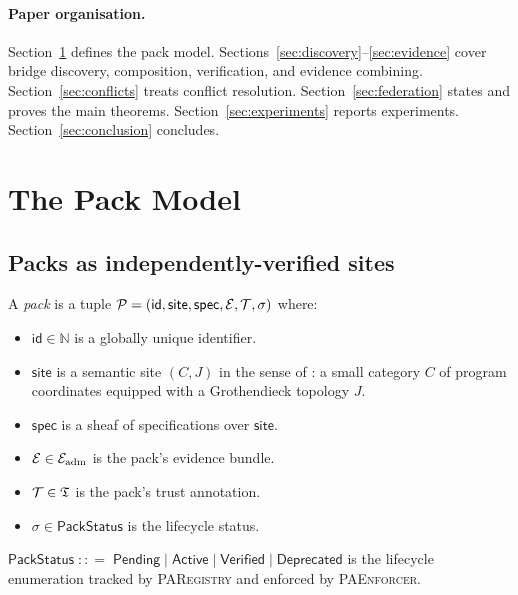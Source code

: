 \documentclass[11pt]{article}
\newcommand{\Pack}{\mathcal{P}}
\newcommand{\PackId}{\mathsf{id}}
\newcommand{\PackSite}{\mathsf{site}}
\newcommand{\PackSpec}{\mathsf{spec}}
\newcommand{\PackSt}{\sigma}
\newcommand{\PackStat}{\mathsf{PackStatus}}
\newcommand{\PAR}{\textsc{PARegistry}}
\newcommand{\PAE}{\textsc{PAEnforcer}}
\begin{document}
\paragraph{Paper organisation.}
Section~\ref{sec:packs} defines the pack model.
Sections~\ref{sec:discovery}--\ref{sec:evidence} cover bridge
discovery, composition, verification, and evidence combining.
Section~\ref{sec:conflicts} treats conflict resolution.
Section~\ref{sec:federation} states and proves the main theorems.
Section~\ref{sec:experiments} reports experiments.
Section~\ref{sec:conclusion} concludes.

\section{The Pack Model}
\label{sec:packs}

\subsection{Packs as independently-verified sites}

\begin{definition}[Pack]
\label{def:pack}
A \emph{pack} is a tuple
$\Pack = (\PackId, \PackSite, \PackSpec, \evid, \trust, \PackSt)$
where:
\begin{itemize}
  \item $\PackId \in \mathbb{N}$ is a globally unique identifier.
  \item $\PackSite$ is a semantic site $(C, J)$ in the sense of
    \cite{jugeo01}: a small category $C$ of program coordinates
    equipped with a Grothendieck topology $J$.
  \item $\PackSpec$ is a sheaf of specifications over $\PackSite$.
  \item $\mathcal{E} \in \mathcal{E}_{\mathrm{adm}}$ is the pack's evidence bundle.
  \item $\mathcal{T} \in \mathfrak{T}$ is the pack's trust annotation.
  \item $\PackSt \in \PackStat$ is the lifecycle status.
\end{itemize}
\end{definition}

\begin{definition}
\label{def:packstatus}
$\PackStat \;{:}{:}{=}\;
  \mathsf{Pending} \mid \mathsf{Active} \mid
  \mathsf{Verified} \mid \mathsf{Deprecated}$
is the lifecycle enumeration tracked by \PAR{} and enforced by \PAE{}.
\end{definition}
\end{document}
